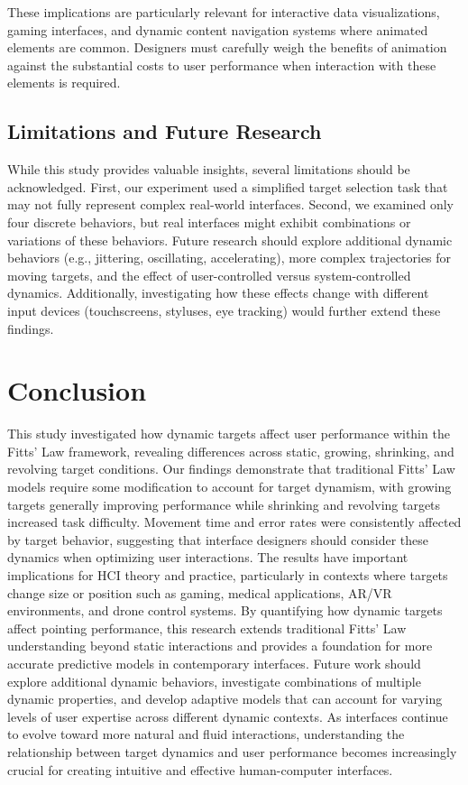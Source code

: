 \documentclass[acmlarge]{acmart}
\begin{document}
These implications are particularly relevant for interactive data visualizations, gaming interfaces, and dynamic content navigation systems where animated elements are common. Designers must carefully weigh the benefits of animation against the substantial costs to user performance when interaction with these elements is required.

\subsection{Limitations and Future Research}
While this study provides valuable insights, several limitations should be acknowledged. First, our experiment used a simplified target selection task that may not fully represent complex real-world interfaces. Second, we examined only four discrete behaviors, but real interfaces might exhibit combinations or variations of these behaviors.
Future research should explore additional dynamic behaviors (e.g., jittering, oscillating, accelerating), more complex trajectories for moving targets, and the effect of user-controlled versus system-controlled dynamics. Additionally, investigating how these effects change with different input devices (touchscreens, styluses, eye tracking) would further extend these findings.



\section{Conclusion}
This study investigated how dynamic targets affect user performance within the Fitts' Law framework, revealing differences across static, growing, shrinking, and revolving target conditions. Our findings demonstrate that traditional Fitts' Law models require some modification to account for target dynamism, with growing targets generally improving performance while shrinking and revolving targets increased task difficulty. Movement time and error rates were consistently affected by target behavior, suggesting that interface designers should consider these dynamics when optimizing user interactions.
The results have important implications for HCI theory and practice, particularly in contexts where targets change size or position such as gaming, medical applications, AR/VR environments, and drone control systems. By quantifying how dynamic targets affect pointing performance, this research extends traditional Fitts' Law understanding beyond static interactions and provides a foundation for more accurate predictive models in contemporary interfaces. Future work should explore additional dynamic behaviors, investigate combinations of multiple dynamic properties, and develop adaptive models that can account for varying levels of user expertise across different dynamic contexts. As interfaces continue to evolve toward more natural and fluid interactions, understanding the relationship between target dynamics and user performance becomes increasingly crucial for creating intuitive and effective human-computer interfaces.
\end{document}

